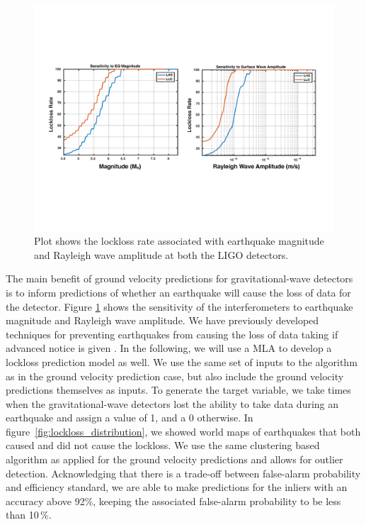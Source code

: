 \documentclass[preprint, aps, showpacs]{revtex4-1}
\begin{document}
\begin{figure}[!htb]
  \includegraphics[width=\textwidth]{./plots/Lockloss_Sensitivity.pdf}
 \caption{Plot shows the lockloss rate associated with earthquake magnitude and Rayleigh wave amplitude at both the LIGO detectors.}
 \label{fig:lockloss_sensitivity}
\end{figure}


The main benefit of ground velocity predictions for gravitational-wave detectors is to inform predictions of whether an earthquake will cause the loss of data for the detector. Figure \ref{fig:lockloss_sensitivity} shows the sensitivity of the interferometers to earthquake magnitude and Rayleigh wave amplitude.
We have previously developed techniques for preventing earthquakes from causing the loss of data taking if advanced notice is given \cite{BiWa2018}.
In the following, we will use a MLA to develop a lockloss prediction model as well. 
We use the same set of inputs to the algorithm as in the ground velocity prediction case, but also include the ground velocity predictions themselves as inputs.
To generate the target variable, we take times when the gravitational-wave detectors lost the ability to take data during an earthquake and assign a value of 1, and a 0 otherwise.
In figure~\ref{fig:lockloss_distribution}, we showed world maps of earthquakes that both caused and did not cause the lockloss. We use the same clustering based algorithm as applied for the ground velocity predictions and allows for outlier detection.
Acknowledging that there is a trade-off between false-alarm probability and efficiency standard, 
we are able to make predictions for the inliers with an accuracy above 92\%, keeping the associated false-alarm probability to be less than 10\,\%.
\end{document}

